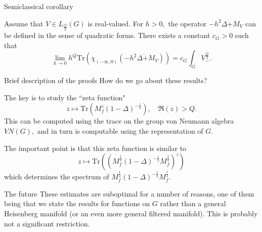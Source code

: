 \documentclass{beamer}
\numberwithin{equation}{section}
\theoremstyle{plain}
\theoremstyle{plain}
\theoremstyle{definition}
\theoremstyle{plain}
\theoremstyle{plain}
\theoremstyle{definition}
\newcommand{\Tr}{\mathrm{Tr}}
\begin{document}
\begin{frame}{Semiclassical corollary}
\begin{corollary}
    Assume that $V\in L_{\frac{Q}{2}}(G)$ is real-valued. For $h>0,$ the operator $-h^2\Delta\dot{+}M_V$ can be defined in the sense of quadratic forms.
    There exists a constant $c_{G}>0$ such that
    \[
        \lim_{h\to 0} h^{Q}\Tr(\chi_{(-\infty,0)}(-h^2\Delta\dot{+}M_V)) = c_{G}\int_{G} V_-^{\frac{Q}{2}}.
    \]
\end{corollary}
\end{frame}

\begin{frame}{Brief description of the proofs}
How do we go about these results?

The key is to study the ``zeta function"
\begin{equation*}
  z\mapsto \Tr(M_f^z(1-\Delta)^{-\frac{z}{2}}),\quad \Re(z) > Q.
\end{equation*}
This can be computed using the trace on the group von Neumann algebra $VN(G),$ and in turn is computable using the representation of $G.$

The important point is that this zeta function is similar to
\[
  z\mapsto \Tr((M_f^{\frac12}(1-\Delta)^{-\frac12}M_f^{\frac12})^z)
\]
which determines the spectrum of $M_f^{\frac12}(1-\Delta)^{-\frac12}M_f^{\frac12}.$


\end{frame}




\begin{frame}{The future}
These estimates are suboptimal for a number of reasons, one of them being that we state the results for functions on $G$ rather than a general Heisenberg manifold (or an even more general filtered manifold). This is probably not a significant restriction.
\end{frame}



\begin{frame}
\end{frame}
\end{document}
